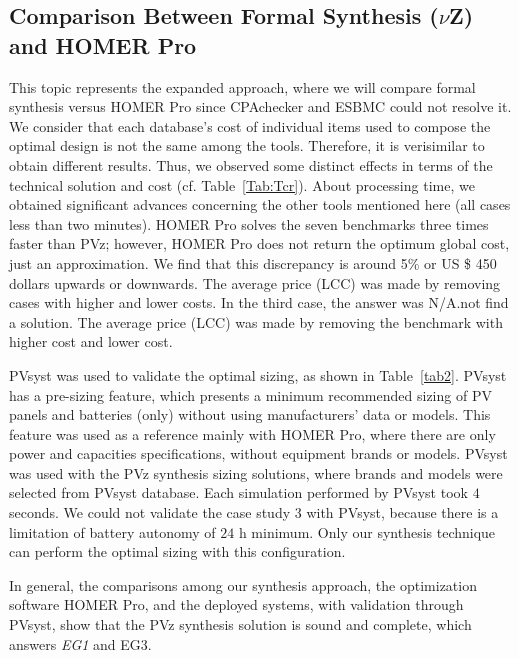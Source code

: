 \documentclass[review]{elsarticle}
\begin{document}
\subsection{Comparison Between Formal Synthesis ($\nu$Z) and HOMER Pro}
  
This topic represents the expanded approach, where we will compare formal synthesis versus HOMER Pro since CPAchecker and ESBMC could not resolve it. We consider that each database's cost of individual items used to compose the optimal design is not the same among the tools. Therefore, it is verisimilar to obtain different results. Thus, we observed some distinct effects in terms of the technical solution and cost (cf. Table~\ref{Tab:Tcr}). About processing time, we obtained significant advances concerning the other tools mentioned here (all cases less than two minutes). HOMER Pro solves the seven benchmarks three times faster than PVz; however, HOMER Pro does not return the optimum global cost, just an approximation. We find that this discrepancy is around 5\% or US \$ 450 dollars upwards or downwards. The average price (LCC) was made by removing cases with higher and lower costs. In the third case, the answer was N/A.not find a solution. The average price (LCC) was made by removing the benchmark with higher cost and lower cost.

PVsyst was used to validate the optimal sizing, as shown in Table~\ref{tab2}. PVsyst has a pre-sizing feature, which presents a minimum recommended sizing of PV panels and batteries (only) without using manufacturers' data or models. This feature was used as a reference mainly with HOMER Pro, where there are only power and capacities specifications, without equipment brands or models.  PVsyst was used with the PVz synthesis sizing solutions, where brands and models were selected from PVsyst database. Each simulation performed by PVsyst took $4$ seconds. We could not validate the case study $3$ with PVsyst, because there is a limitation of battery autonomy of $24$ h minimum. Only our synthesis technique can perform the optimal sizing with this configuration.

In general, the comparisons among our synthesis approach, the optimization software HOMER Pro, and the deployed systems, with validation through PVsyst, show that the PVz synthesis solution is sound and complete, which answers \textit{EG1} and {EG3}.
\end{document}
